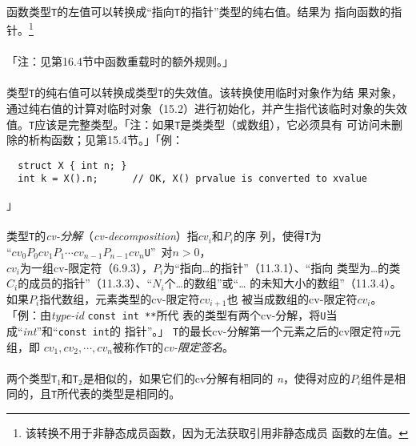 \paragraph{}
函数类型\texttt{T}的左值可以转换成``指向\texttt{T}的指针''类型的纯右值。结果为
指向函数的指针。\footnote{该转换不用于非静态成员函数，因为无法获取引用非静态成员
函数的左值。}

\paragraph{}
「注：见第16.4节中函数重载时的额外规则。」

\paragraph{}
类型\texttt{T}的纯右值可以转换成类型\texttt{T}的失效值。该转换使用临时对象作为结
果对象，通过纯右值的计算对临时对象（15.2）进行初始化，并产生指代该临时对象的失效
值。\texttt{T}应该是完整类型。「注：如果\texttt{T}是类类型（或数组），它必须具有
可访问未删除的析构函数；见第15.4节。」「例：
\begin{lstlisting}
  struct X { int n; }
  int k = X().n;      // OK, X() prvalue is converted to xvalue
\end{lstlisting}」

\paragraph{}
类型\texttt{T}的\textit{cv-分解}（\textit{cv-decomposition}）指$cv_i$和$P_i$的序
列，使得\texttt{T}为                                                          \\
\mbox{\qquad\qquad “$cv_0P_0cv_1P_1\cdots cv_{n-1}P_{n-1}cv_n$\texttt{U}”
  对$n > 0$，}                                                                \\
$cv_i$为一组cv-限定符（6.9.3），$P_i$为“指向\ldots 的指针”（11.3.1）、“指向
类型为\ldots 的类$C_i$的成员的指针”（11.3.3）、“$N_i$个\ldots 的数组”或“\ldots
的未知大小的数组”（11.3.4）。如果$P_i$指代数组，元素类型的cv-限定符$cv_{i+1}$也
被当成数组的cv-限定符$cv_i$。「例：由\textit{type-id} \texttt{const int **}所代
表的类型有两个cv-分解，将\texttt{U}当成``\textit{int}''和``\texttt{const int}的
指针''。」 \texttt{T}的最长cv-分解第一个元素之后的cv限定符\textit{n}元组，即
$cv_1, cv_2, \cdots, cv_n$被称作\texttt{T}的\textit{cv-限定签名}。

\paragraph{}
两个类型\texttt{T$_1$}和\texttt{T$_2$}是相似的，如果它们的cv分解有相同的
\textit{n}，使得对应的$P_i$组件是相同的，且\texttt{T}所代表的类型是相同的。

